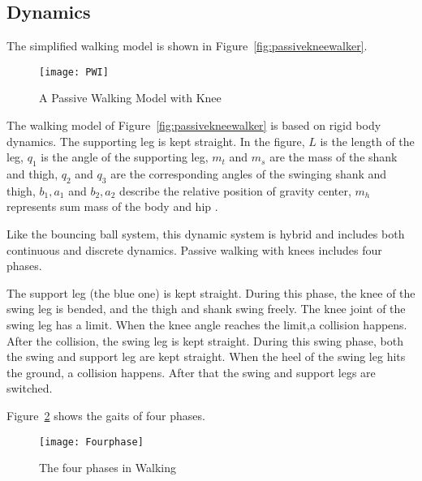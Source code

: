 \subsection*{Dynamics}

The simplified walking model is shown in Figure~\ref{fig:passivekneewalker}.

\begin{figure}[!htbp]
  \begin{center}
    \texttt{[image: PWI]}
    \caption{A Passive Walking Model with Knee}
    \label{fig:}
  \end{center}
\end{figure}
The walking model of Figure~\ref{fig:passivekneewalker} is based on rigid body dynamics.
The supporting leg is kept straight.
In the figure, $L$ is the length of the leg, $q_1$ is the angle of the supporting leg,
$m_t$ and $m_s$ are the mass of the shank and thigh,
$q_2$ and $q_3$ are the corresponding angles of the swinging shank and thigh,
$b_1,a_1$ and $b_2,a_2$ describe the relative position of gravity center,
$m_h$ represents sum mass of the body and hip .






Like the bouncing ball system, this dynamic system is hybrid\citep{ames2006categorical} and includes both continuous and discrete dynamics.
Passive walking with knees includes four phases\citep{Chen2007}.
\begin{itemize}
The support leg (the blue one) is kept straight.
During this phase, the knee of the swing leg is bended, and the thigh and shank swing freely.
The knee joint of the swing leg has a limit.
When the knee angle reaches the limit,a collision happens.
After the collision, the swing leg is kept straight.
During this swing phase, both the swing and support leg are kept straight.
When the heel of the swing leg hits the ground, a collision happens.
After that the swing and support legs are switched.
\end{itemize}

Figure~\ref{fig:fwalkingphase} shows the gaits of four phases.
\begin{figure}[!htbp]
  \begin{center}
      \texttt{[image: Fourphase]}
    \caption{The four phases in Walking}
    \label{fig:fwalkingphase}
\end{center}
\end{figure}





